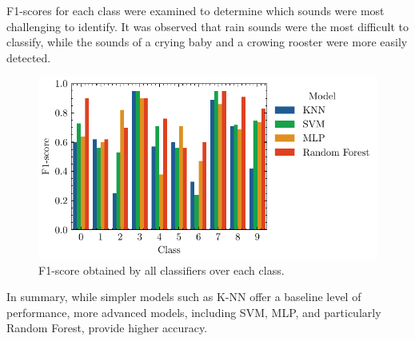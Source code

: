 \documentclass[journal]{IEEEtran}
\begin{document}
F1-scores for each class were examined to determine which sounds were most challenging to identify. It was observed that rain sounds were the most difficult to classify, while the sounds of a crying baby and a crowing rooster were more easily detected.

\begin{figure}[t]
    \centering
    \includegraphics[width=\linewidth]{class_f1.pdf}
    \caption{F1-score obtained by all classifiers over each class.}
    \label{fig:class_f1}
\end{figure}

In summary, while simpler models such as K-NN offer a baseline level of performance, more advanced models, including SVM, MLP, and particularly Random Forest, provide higher accuracy.


%
\end{document}
